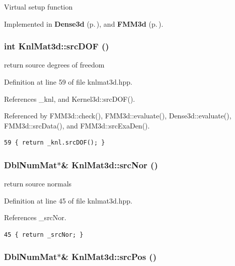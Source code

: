 Virtual setup function 

Implemented in {\bf Dense3d} {\rm (p.\,\pageref{classDense3d_6c9d66eef2ad01ccfea65cb116bf5726_6c9d66eef2ad01ccfea65cb116bf5726})}, and {\bf FMM3d} {\rm (p.\,\pageref{classFMM3d_d134e155a30bcbea9ad038ffcd737ddc_d134e155a30bcbea9ad038ffcd737ddc})}.
\subsubsection{\setlength{\rightskip}{0pt plus 5cm}int Knl\-Mat3d::src\-DOF ()\hspace{0.3cm}{\tt  [inline]}}\label{classKnlMat3d_6b422ba557bb24eff82ac7125e206568_6b422ba557bb24eff82ac7125e206568}


return source degrees of freedom 

Definition at line 59 of file knlmat3d.hpp.

References \_\-knl, and Kernel3d::src\-DOF().

Referenced by FMM3d::check(), FMM3d::evaluate(), Dense3d::evaluate(), FMM3d::src\-Data(), and FMM3d::src\-Exa\-Den().

\footnotesize\begin{verbatim}59 { return _knl.srcDOF(); }
\end{verbatim}\normalsize 


\subsubsection{\setlength{\rightskip}{0pt plus 5cm}Dbl\-Num\-Mat$\ast$\& Knl\-Mat3d::src\-Nor ()\hspace{0.3cm}{\tt  [inline]}}\label{classKnlMat3d_bba2c6a917421951f1fbe8f69b9a135b_bba2c6a917421951f1fbe8f69b9a135b}


return source normals 

Definition at line 45 of file knlmat3d.hpp.

References \_\-src\-Nor.

\footnotesize\begin{verbatim}45 { return _srcNor; }
\end{verbatim}\normalsize 


\subsubsection{\setlength{\rightskip}{0pt plus 5cm}Dbl\-Num\-Mat$\ast$\& Knl\-Mat3d::src\-Pos ()\hspace{0.3cm}{\tt  [inline]}}\label{classKnlMat3d_caa1dae06f56964efa0f778b696dce61_caa1dae06f56964efa0f778b696dce61}


